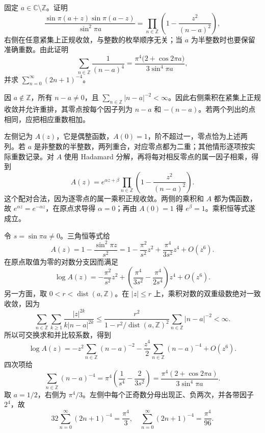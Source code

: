 \begin{exercise}[移位乘积与四次幂和]\label{b3:ex:20-draft-05}
固定 \(a\in\mathbb C\setminus\mathbb Z\)。证明
\[
 \frac{\sin\pi(a+z)\sin\pi(a-z)}{\sin^2\pi a}
 =\prod_{n\in\mathbb Z}\left(1-\frac{z^2}{(n-a)^2}\right),
\]
右侧在任意紧集上正规收敛，与整数的枚举顺序无关；当 \(a\) 为半整数时也要保留准确重数。由此证明
\[
 \sum_{n\in\mathbb Z}\frac1{(n-a)^4}
 =\frac{\pi^4\bigl(2+\cos2\pi a\bigr)}{3\sin^4\pi a},
\]
并求 \(\sum_{n=0}^\infty(2n+1)^{-4}\)。
\end{exercise}
\begin{solution}
因 \(a\notin\mathbb Z\)，所有 \(n-a\ne0\)，且 \(\sum_{n\in\mathbb Z}|n-a|^{-2}<\infty\)。因此右侧乘积在紧集上正规收敛并允许重排，其零点按每个因子列为 \(n-a\) 和 \(-(n-a)\)。若两个列出的点相同，应把相应重数相加。

左侧记为 \(A(z)\)，它是偶整函数，\(A(0)=1\)，阶不超过一，零点恰为上述两列。若 \(a\) 是非整数的半整数，两列重合，对应零点都为二重；其他情形逐项按实际重数记录。对 \(A\) 使用 Hadamard 分解，再将每对相反零点的属一因子相乘，得到
\[
 A(z)=e^{\alpha z+\beta}
 \prod_{n\in\mathbb Z}\left(1-\frac{z^2}{(n-a)^2}\right).
\]
这个配对合法，因为逐零点的属一乘积正规收敛。两侧的乘积和 \(A\) 都为偶函数，故 \(e^{\alpha z}=e^{-\alpha z}\)，在原点求导得 \(\alpha=0\)；再由 \(A(0)=1\) 得 \(e^\beta=1\)。乘积恒等式遂成立。

令 \(s=\sin\pi a\ne0\)。三角恒等式给
\[
 A(z)=1-\frac{\sin^2\pi z}{s^2}
 =1-\frac{\pi^2}{s^2}z^2+\frac{\pi^4}{3s^2}z^4+O(z^6).
\]
在原点取值为零的对数分支因而满足
\[
 \log A(z)=-\frac{\pi^2}{s^2}z^2
 +\left(\frac{\pi^4}{3s^2}-\frac{\pi^4}{2s^4}\right)z^4+O(z^6).
\]
另一方面，取 \(0<r<\operatorname{dist}(a,\mathbb Z)\)。在 \(|z|\le r\) 上，乘积对数的双重级数绝对一致收敛，因为
\[
 \sum_{n\in\mathbb Z}\sum_{k\ge1}
 \frac{|z|^{2k}}{k|n-a|^{2k}}
 \le\frac{r^2}{1-r^2/\operatorname{dist}(a,\mathbb Z)^2}
 \sum_{n\in\mathbb Z}|n-a|^{-2}<\infty.
\]
所以可交换求和并比较系数，得到
\[
 \log A(z)
 =-z^2\sum_{n\in\mathbb Z}(n-a)^{-2}
 -\frac{z^4}2\sum_{n\in\mathbb Z}(n-a)^{-4}+O(z^6).
\]
四次项给
\[
 \sum_{n\in\mathbb Z}(n-a)^{-4}
 =\pi^4\left(\frac1{s^4}-\frac2{3s^2}\right)
 =\frac{\pi^4(2+\cos2\pi a)}{3\sin^4\pi a}.
\]
取 \(a=1/2\)，右侧为 \(\pi^4/3\)。左侧中每个正奇数分母出现正、负两次，并各带因子 \(2^4\)，故
\[
 32\sum_{n=0}^\infty(2n+1)^{-4}=\frac{\pi^4}3,
 \quad
 \sum_{n=0}^\infty(2n+1)^{-4}=\frac{\pi^4}{96}.
\]
\end{solution}

